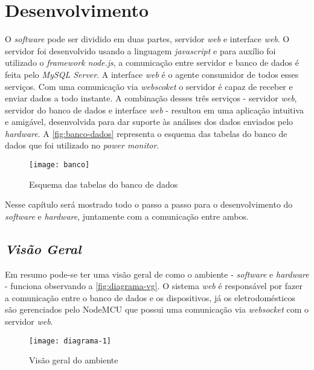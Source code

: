 \chapter[Desenvolvimento]{Desenvolvimento}
\label{ch:desenvolvimento}

O \textit{software} pode ser dividido em duas partes, servidor \textit{web} e interface \textit{web}. O servidor foi desenvolvido usando a linguagem
\textit{javascript} e para auxílio foi utilizado o \textit{framework node.js}, a comunicação entre servidor e banco de dados
é feita pelo \textit{MySQL Server}. A interface \textit{web} é o agente consumidor de todos esses serviços. Com uma comunicação via 
\textit{webscoket} o servidor é capaz de receber e enviar dados a todo instante. A combinação desses três serviços - servidor \textit{web},
servidor do banco de dados e interface \textit{web} - resultou em uma aplicação intuitiva e amigável, desenvolvida para dar suporte às análises dos dados
enviados pelo \textit{hardware}. A \autoref{fig:banco-dados} representa o esquema das tabelas do banco de dados que foi utilizado no \textit{power monitor}. 


\begin{figure}[h!]
	\texttt{[image: banco]}
	\centering
	\caption[Esquema das tabelas do banco de dados]{Esquema das tabelas do banco de dados}
	\label{fig:banco-dados}
\end{figure}
\FloatBarrier

Nesse capítulo será mostrado todo o passo a passo para o desenvolvimento do \textit{software} e \textit{hardware}, juntamente com a comunicação 
entre ambos.

\section[\textit{Visão Geral}]{\textit{Visão Geral}}\label{visal-geral}

Em resumo pode-se ter uma visão geral de como o ambiente - \textit{software} e \textit{hardware} - funciona observando a \autoref{fig:diagrama-vg}.
O sistema \textit{web} é responsável por fazer a comunicação entre o banco de dados e os dispositivos, já os eletrodomésticos são gerenciados
pelo NodeMCU que possui uma comunicação via \textit{websocket} com o servidor \textit{web}.

\begin{figure}[h!]
	\texttt{[image: diagrama-1]}
	\centering
	\caption[Visão geral do ambiente]{Visão geral do ambiente}
	\label{fig:diagrama-vg}
\end{figure}
\FloatBarrier


